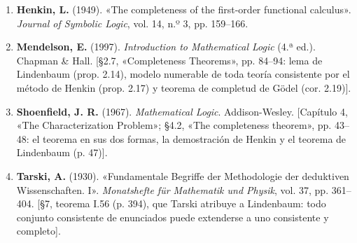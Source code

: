 \begin{enumerate}
    \item \textbf{Henkin, L.} (1949). «The completeness of the first-order functional calculus». \emph{Journal of Symbolic Logic}, vol. 14, n.º 3, pp. 159--166.
    \item \textbf{Mendelson, E.} (1997). \emph{Introduction to Mathematical Logic} (4.ª ed.). Chapman \& Hall. [§2.7, «Completeness Theorems», pp. 84--94: lema de Lindenbaum (prop. 2.14), modelo numerable de toda teoría consistente por el método de Henkin (prop. 2.17) y teorema de completud de Gödel (cor. 2.19)].
    \item \textbf{Shoenfield, J. R.} (1967). \emph{Mathematical Logic}. Addison-Wesley. [Capítulo 4, «The Characterization Problem»; §4.2, «The completeness theorem», pp. 43--48: el teorema en sus dos formas, la demostración de Henkin y el teorema de Lindenbaum (p. 47)].
    \item \textbf{Tarski, A.} (1930). «Fundamentale Begriffe der Methodologie der deduktiven Wissenschaften. I». \emph{Monatshefte für Mathematik und Physik}, vol. 37, pp. 361--404. [§7, teorema I.56 (p. 394), que Tarski atribuye a Lindenbaum: todo conjunto consistente de enunciados puede extenderse a uno consistente y completo].
\end{enumerate}

